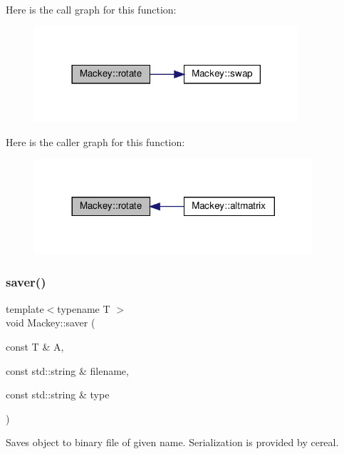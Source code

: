 Here is the call graph for this function\+:\nopagebreak
\begin{figure}[H]
\begin{center}
\leavevmode
\includegraphics[width=278pt]{namespaceMackey_a38a833de54971845cbdb8c96f830725b_cgraph}
\end{center}
\end{figure}
Here is the caller graph for this function\+:\nopagebreak
\begin{figure}[H]
\begin{center}
\leavevmode
\includegraphics[width=293pt]{namespaceMackey_a38a833de54971845cbdb8c96f830725b_icgraph}
\end{center}
\end{figure}
\mbox{\label{namespaceMackey_a1824d780ce15f1845e4f87bf056feec9}} 
\subsubsection{\texorpdfstring{saver()}{saver()}}
{\footnotesize\ttfamily template$<$typename T $>$ \\
void Mackey\+::saver (\begin{DoxyParamCaption}\item[{const T \&}]{A,  }\item[{const std\+::string \&}]{filename,  }\item[{const std\+::string \&}]{type }\end{DoxyParamCaption})}



Saves object to binary file of given name. Serialization is provided by cereal. 

